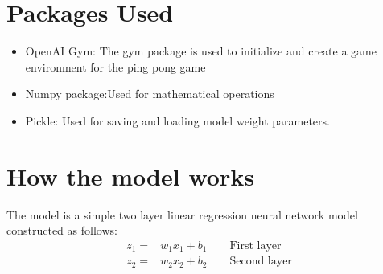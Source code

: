 \documentclass[12pt,a4paper]{article}
\begin{document}
\section{Packages Used}

\begin{itemize}
 \item OpenAI Gym: The gym package is used to initialize and create a game environment for the ping pong game 
\end{itemize}

\begin{itemize}
 \item Numpy package:Used for mathematical operations
\end{itemize}

\begin{itemize}
\item Pickle: Used for saving and loading model weight parameters.
\end{itemize}


\section{How the model works}

The model is a simple two layer linear regression neural network model constructed as follows:
\begin{align}
z_1 =& w_1x_1+b_1\quad\quad\text{First layer}\\
z_2 =& w_2x_2+b_2\quad\quad\text{Second layer}
\end{align}
\end{document}
